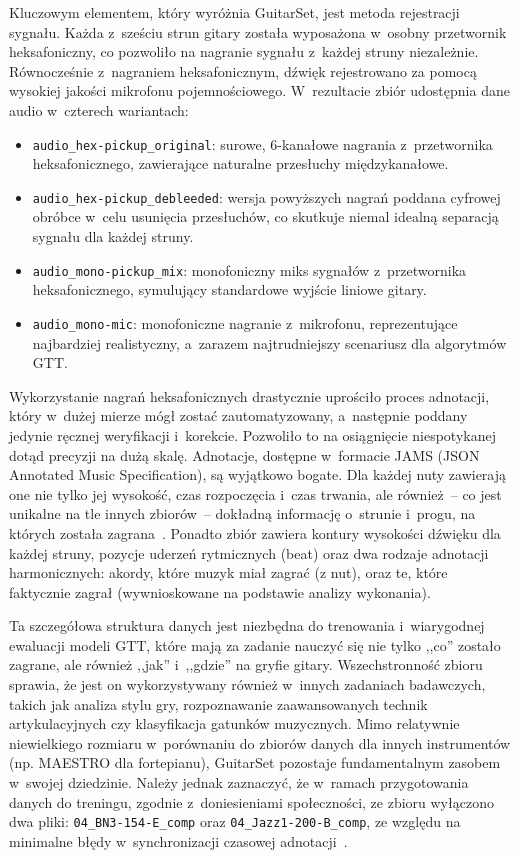 Kluczowym elementem, który wyróżnia GuitarSet, jest metoda rejestracji sygnału. Każda z~sześciu strun gitary została wyposażona w~osobny przetwornik heksafoniczny, co pozwoliło na nagranie sygnału z~każdej struny niezależnie. Równocześnie z~nagraniem heksafonicznym, dźwięk rejestrowano za pomocą wysokiej jakości mikrofonu pojemnościowego. W~rezultacie zbiór udostępnia dane audio w~czterech wariantach:
\begin{itemize}
    \item \texttt{audio\_hex-pickup\_original}: surowe, 6-kanałowe nagrania z~przetwornika heksafonicznego, zawierające naturalne przesłuchy międzykanałowe.
    \item \texttt{audio\_hex-pickup\_debleeded}: wersja powyższych nagrań poddana cyfrowej obróbce w~celu usunięcia przesłuchów, co skutkuje niemal idealną separacją sygnału dla każdej struny.
    \item \texttt{audio\_mono-pickup\_mix}: monofoniczny miks sygnałów z~przetwornika heksafonicznego, symulujący standardowe wyjście liniowe gitary.
    \item \texttt{audio\_mono-mic}: monofoniczne nagranie z~mikrofonu, reprezentujące najbardziej realistyczny, a~zarazem najtrudniejszy scenariusz dla algorytmów GTT.
\end{itemize}

Wykorzystanie nagrań heksafonicznych drastycznie uprościło proces adnotacji, który w~dużej mierze mógł zostać zautomatyzowany, a~następnie poddany jedynie ręcznej weryfikacji i~korekcie. Pozwoliło to na osiągnięcie niespotykanej dotąd precyzji na dużą skalę. Adnotacje, dostępne w~formacie JAMS (JSON Annotated Music Specification), są wyjątkowo bogate. Dla każdej nuty zawierają one nie tylko jej wysokość, czas rozpoczęcia i~czas trwania, ale również~– co jest unikalne na tle innych zbiorów~– dokładną informację o~strunie i~progu, na których została zagrana~\autocite{Wiggins2019TabCNN, Xi2018}. Ponadto zbiór zawiera kontury wysokości dźwięku dla każdej struny, pozycje uderzeń rytmicznych (beat) oraz dwa rodzaje adnotacji harmonicznych: akordy, które muzyk miał zagrać (z nut), oraz te, które faktycznie zagrał (wywnioskowane na podstawie analizy wykonania).

Ta szczegółowa struktura danych jest niezbędna do trenowania i~wiarygodnej ewaluacji modeli GTT, które mają za zadanie nauczyć się nie tylko ,,co'' zostało zagrane, ale również ,,jak'' i~,,gdzie'' na gryfie gitary. Wszechstronność zbioru sprawia, że jest on wykorzystywany również w~innych zadaniach badawczych, takich jak analiza stylu gry, rozpoznawanie zaawansowanych technik artykulacyjnych czy klasyfikacja gatunków muzycznych. Mimo relatywnie niewielkiego rozmiaru w~porównaniu do zbiorów danych dla innych instrumentów (np. MAESTRO dla fortepianu), GuitarSet pozostaje fundamentalnym zasobem w~swojej dziedzinie. Należy jednak zaznaczyć, że w~ramach przygotowania danych do treningu, zgodnie z~doniesieniami społeczności, ze zbioru wyłączono dwa pliki: \texttt{04\_BN3-154-E\_comp} oraz \texttt{04\_Jazz1-200-B\_comp}, ze względu na minimalne błędy w~synchronizacji czasowej adnotacji~\autocite{Riley2023GuitarSetIssue}.

